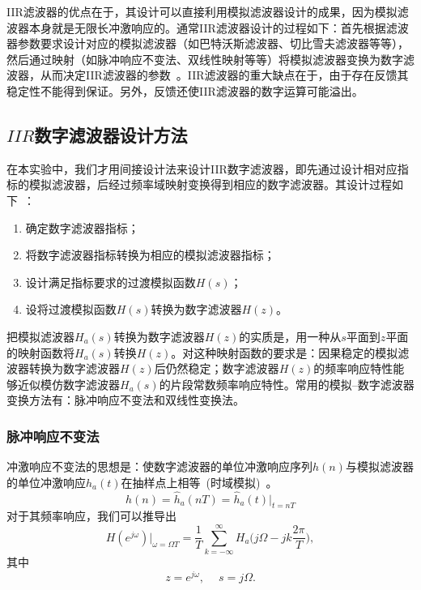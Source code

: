 \documentclass[a4paper,11pt,onecolumn,twoside]{article}
\begin{document}
IIR滤波器的优点在于，其设计可以直接利用模拟滤波器设计的成果，因为模拟滤波器本身就是无限长冲激响应的。通常IIR滤波器设计的过程如下：首先根据滤波器参数要求设计对应的模拟滤波器（如巴特沃斯滤波器、切比雪夫滤波器等等），然后通过映射（如脉冲响应不变法、双线性映射等等）将模拟滤波器变换为数字滤波器，从而决定IIR滤波器的参数~\supercite{course1}。IIR滤波器的重大缺点在于，由于存在反馈其稳定性不能得到保证。另外，反馈还使IIR滤波器的数字运算可能溢出。

\subsection{$IIR$数字滤波器设计方法}
在本实验中，我们才用间接设计法来设计IIR数字滤波器，即先通过设计相对应指标的模拟滤波器，后经过频率域映射变换得到相应的数字滤波器。其设计过程如下~\supercite{course3}：
\begin{enumerate}
\item 确定数字滤波器指标；
\item 将数字滤波器指标转换为相应的模拟滤波器指标；
\item 设计满足指标要求的过渡模拟函数$H(s)$；
\item 设将过渡模拟函数$H(s)$转换为数字滤波器$H(z)$。
\end{enumerate}

把模拟滤波器$H_a(s)$转换为数字滤波器$H(z)$的实质是，用一种从$s$平面到$z$平面的映射函数将$H_a(s)$转换$H(z)$。对这种映射函数的要求是：因果稳定的模拟滤波器转换为数字滤波器$H(z)$后仍然稳定；数字滤波器$H(z)$的频率响应特性能够近似模仿数字滤波器$H_a(s)$的片段常数频率响应特性。常用的模拟--数字滤波器变换方法有：脉冲响应不变法和双线性变换法。

\subsubsection{脉冲响应不变法}
冲激响应不变法的思想是：使数字滤波器的单位冲激响应序列$h(n)$与模拟滤波器的单位冲激响应$h_a(t)$在抽样点上相等~(时域模拟)~\supercite{course3}。
\begin{equation}
h(n) = \hat{h}_a(nT) = \hat{h}_a(t) \big|_{t=nT}
\end{equation}
对于其频率响应，我们可以推导出
\begin{equation}
H(e^{j\omega})\big|_{\omega = \Omega T} = \frac{1}{T} \sum_{k= - \infty}^{\infty} H_a\big( j\Omega -jk\frac{2\pi}{T} \big),
\end{equation}
其中
\begin{equation}
z = e^{j\omega}, \quad \ s = j\Omega.
\end{equation}
\end{document}

